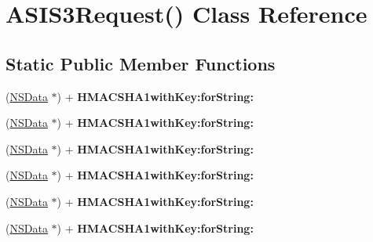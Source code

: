 \hypertarget{interface_a_s_i_s3_request_07_08}{
\section{\-A\-S\-I\-S3\-Request() \-Class \-Reference}
\label{interface_a_s_i_s3_request_07_08}
}
\subsection*{\-Static \-Public \-Member \-Functions}
\begin{DoxyCompactItemize}
\item 
\hypertarget{interface_a_s_i_s3_request_07_08_a894f809afa5c5ec55231089f2d2af54f}{
(\hyperlink{class_n_s_data}{\-N\-S\-Data} $\ast$) + {\bfseries \-H\-M\-A\-C\-S\-H\-A1with\-Key\-:for\-String\-:}}
\label{interface_a_s_i_s3_request_07_08_a894f809afa5c5ec55231089f2d2af54f}

\item 
\hypertarget{interface_a_s_i_s3_request_07_08_a894f809afa5c5ec55231089f2d2af54f}{
(\hyperlink{class_n_s_data}{\-N\-S\-Data} $\ast$) + {\bfseries \-H\-M\-A\-C\-S\-H\-A1with\-Key\-:for\-String\-:}}
\label{interface_a_s_i_s3_request_07_08_a894f809afa5c5ec55231089f2d2af54f}

\item 
\hypertarget{interface_a_s_i_s3_request_07_08_a894f809afa5c5ec55231089f2d2af54f}{
(\hyperlink{class_n_s_data}{\-N\-S\-Data} $\ast$) + {\bfseries \-H\-M\-A\-C\-S\-H\-A1with\-Key\-:for\-String\-:}}
\label{interface_a_s_i_s3_request_07_08_a894f809afa5c5ec55231089f2d2af54f}

\item 
\hypertarget{interface_a_s_i_s3_request_07_08_a894f809afa5c5ec55231089f2d2af54f}{
(\hyperlink{class_n_s_data}{\-N\-S\-Data} $\ast$) + {\bfseries \-H\-M\-A\-C\-S\-H\-A1with\-Key\-:for\-String\-:}}
\label{interface_a_s_i_s3_request_07_08_a894f809afa5c5ec55231089f2d2af54f}

\item 
\hypertarget{interface_a_s_i_s3_request_07_08_a894f809afa5c5ec55231089f2d2af54f}{
(\hyperlink{class_n_s_data}{\-N\-S\-Data} $\ast$) + {\bfseries \-H\-M\-A\-C\-S\-H\-A1with\-Key\-:for\-String\-:}}
\label{interface_a_s_i_s3_request_07_08_a894f809afa5c5ec55231089f2d2af54f}

\item 
\hypertarget{interface_a_s_i_s3_request_07_08_a894f809afa5c5ec55231089f2d2af54f}{
(\hyperlink{class_n_s_data}{\-N\-S\-Data} $\ast$) + {\bfseries \-H\-M\-A\-C\-S\-H\-A1with\-Key\-:for\-String\-:}}
\label{interface_a_s_i_s3_request_07_08_a894f809afa5c5ec55231089f2d2af54f}


\end{DoxyCompactItemize}
